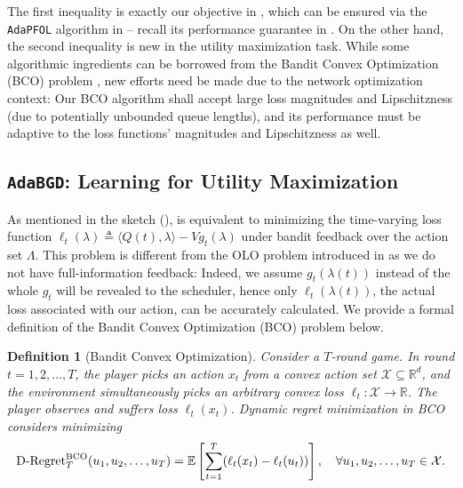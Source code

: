 \documentclass[11pt,fullpage,letterpaper]{article} %
\newtheorem{definition}[theorem]{Definition}
\renewcommand{\bm}[1]{#1}%
\newcommand{\E}{\operatornamewithlimits{\mathbb{E}}}
\newcommand{\OLOAlg}{\texttt{AdaPFOL}\xspace}
\newcommand{\BCOAlg}{\texttt{AdaBGD}\xspace}
\begin{document}
The first inequality is exactly our objective in , which can be ensured via the \OLOAlg algorithm in  -- recall its performance guarantee in .
On the other hand, the second inequality is new in the utility maximization task.
While some algorithmic ingredients can be borrowed from the {Bandit Convex Optimization} (BCO) problem \citep{flaxman2005online}, new efforts need be made due to the network optimization context: Our BCO algorithm shall accept large loss magnitudes and Lipschitzness (due to potentially unbounded queue lengths), and its performance must be adaptive to the loss functions' magnitudes and Lipschitzness as well.

\subsection{\BCOAlg: Learning for Utility Maximization}\label{sec:multi-hop utility BCO}
As mentioned in the sketch (),  is equivalent to minimizing the time-varying loss function $\ell_t(\bm \lambda)\triangleq \langle Q(t),\bm \lambda\rangle - V g_t(\bm \lambda)$ under bandit feedback over the action set $\Lambda$.
This problem is different from the OLO problem introduced in  as we do not have full-information feedback:
Indeed, we assume $g_t(\bm \lambda(t))$ instead of the whole $g_t$ will be revealed to the scheduler, hence only $\ell_t(\bm \lambda(t))$, the actual loss associated with our action, can be accurately calculated.
We provide a formal definition of the {Bandit Convex Optimization} (BCO) problem \citep{flaxman2005online,chen2018bandit} below. 
\begin{definition}[Bandit Convex Optimization]\label{def:BCO}
Consider a $T$-round game. In round $t=1,2,\ldots,T$, the player picks an action $\bm x_t$ from a convex action set $\mathcal X\subseteq \mathbb R^d$, and the environment simultaneously picks an arbitrary convex loss $\ell_t\colon \mathcal X\to \mathbb R$. The player observes and suffers loss $\ell_t(\bm x_t)$. Dynamic regret minimization in BCO considers minimizing
\begin{equation*}
\text{D-Regret}_T^{\text{BCO}}(\bm u_1,\bm u_2,\ldots,\bm u_T)=\E\left [\sum_{t=1}^T (\ell_t(\bm x_t)-\ell_t(\bm u_t))\right ],\quad \forall \bm u_1,\bm u_2,\ldots,\bm u_T\in \mathcal X.
\end{equation*}
\end{definition}
\end{document}
